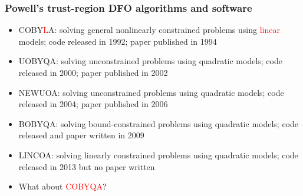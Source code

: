 \documentclass[slidestop,mathserif,xcolor=dvipsnames]{beamer}
\newcommand{\blue}[1]{\textcolor{blue}{#1}}
\newcommand{\red}[1]{\textcolor{red}{#1}}
\begin{document}
\begin{frame}
  \frametitle{Powell's trust-region DFO algorithms and software}

      \vspace{1ex}
      \begin{itemize}
          \item  COBY\red{L}A: solving general nonlinearly constrained problems using \red{linear} models; code released in 1992; paper published in 1994
      \vspace{1ex}

    \item  UOBYQA: solving unconstrained problems using quadratic models; code released in 2000; paper published in 2002
      \vspace{1ex}

    \item  NEWUOA: solving unconstrained problems using quadratic models; code released in 2004; paper published in 2006
      \vspace{1ex}

    \item  BOBYQA:
       solving bound-constrained problems using
       quadratic models; code released and paper written in 2009

      \vspace{1ex}
     \item  LINCOA:
       solving linearly constrained problems using
       quadratic models; code released in 2013 but no paper written

       \vspace{1ex}
       \pause
       \item What about \red{COBYQA}? %
  \end{itemize}
\end{frame}

\end{document}
